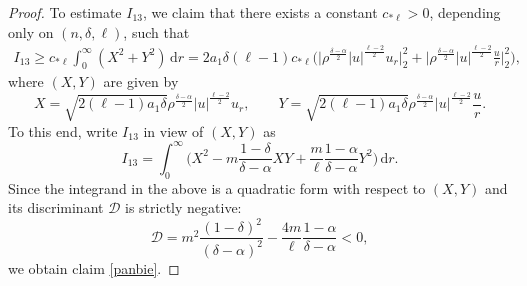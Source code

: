 \documentclass[11pt,reqno]{amsart}
\numberwithin{rk}{section}
\numberwithin{prop}{section}
\numberwithin{mydef}{section}
\numberwithin{lem}{section}
\numberwithin{equation}{section}
\numberwithin{thm}{section}
\begin{document}
\begin{proof}
To estimate $I_{13}$, we claim that there exists a constant $c_{*\ell}>0$, depending only on $(n,\delta,\ell)$, such that
\begin{equation}\label{panbie}
\begin{aligned}
I_{13}\geq c_{*\ell}\int_0^\infty (X^2+Y^2)\,\mathrm{d}r=2a_1\delta(\ell-1)c_{*\ell}\Big(\big|\rho^\frac{\delta-\alpha}{2}|u|^\frac{\ell-2}{2}u_r\big|_2^2+\Big|\rho^\frac{\delta-\alpha}{2}|u|^\frac{\ell-2}{2}\frac{u}{r}\Big|_2^2\Big),
\end{aligned} 
\end{equation}
where $(X,Y)$ are given by
\begin{equation*}
X=\sqrt{2(\ell-1)a_1\delta} \rho^\frac{\delta-\alpha}{2}|u|^\frac{\ell-2}{2}u_r,\qquad Y=\sqrt{2(\ell-1)a_1\delta} \rho^\frac{\delta-\alpha}{2}|u|^\frac{\ell-2}{2}\frac{u}{r}.
\end{equation*}
To this end, write $I_{13}$ in view of $(X,Y)$ as
\begin{equation*}
I_{13}=\int_0^\infty \Big(X^2-m\frac{1-\delta}{\delta-\alpha}XY+\frac{m}{\ell}\frac{1-\alpha}{\delta-\alpha}Y^2\Big)\,\mathrm{d}r.    
\end{equation*}
Since the integrand in the above is a quadratic form with respect to $(X,Y)$ and its discriminant $\mathscr{D}$ is strictly negative:
\begin{equation*}
\mathscr{D}=m^2\frac{(1-\delta)^2}{(\delta-\alpha)^2}-\frac{4m}{\ell}\frac{1-\alpha}{\delta-\alpha}<0,
\end{equation*}
we obtain claim \eqref{panbie}.


\end{proof}
\end{document}

